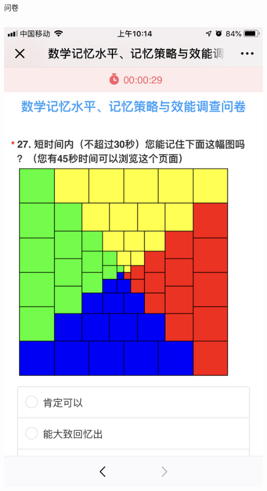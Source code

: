 \documentclass[serif]{beamer}
\begin{document}
\begin{frame}{问卷}
\begin{columns}
        	\includegraphics[scale=0.09]{test27.png}
        \end{columns}            
    \end{frame}
    
\end{document}
